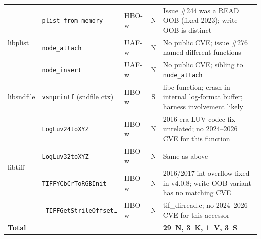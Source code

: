 \begin{table}[htb]
{\begin{tabular}{lllcl}
\midrule
\multirow{3}{*}{libplist}
  & \texttt{plist\_from\_memory}       & HBO-w & N & Issue \#244 was a READ OOB (fixed 2023); write OOB is distinct \\
  & \texttt{node\_attach}              & UAF-w & N & No public CVE; issue \#276 named different functions \\
  & \texttt{node\_insert}              & UAF-w & N & No public CVE; sibling to \texttt{node\_attach} \\
\midrule
libsndfile
  & \texttt{vsnprintf} (sndfile ctx)   & HBO-w & S & libc function; crash in internal log-format buffer; harness involvement likely \\
\midrule
\multirow{4}{*}{libtiff}
  & \texttt{LogLuv24toXYZ}             & HBO-w & N & 2016-era LUV codec fix unrelated; no 2024--2026 CVE for this function \\
  & \texttt{LogLuv32toXYZ}             & HBO-w & N & Same as above \\
  & \texttt{TIFFYCbCrToRGBInit}        & HBO-w & N & 2016/2017 int overflow fixed in v4.0.8; write OOB variant has no matching CVE \\
  & \texttt{\_TIFFGetStrileOffset\ldots} & HBO-w & N & tif\_dirread.c; no 2024--2026 CVE for this accessor \\
\midrule
\multicolumn{2}{l}{\textbf{Total}} & & & \textbf{29~N, 3~K, 1~V, 3~S} \\
\bottomrule
\end{tabular}
}
\end{table}
